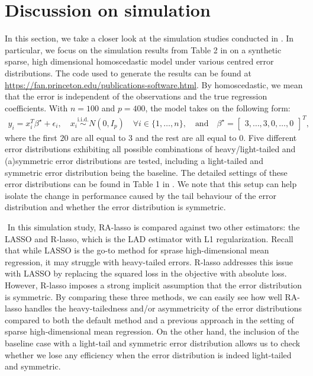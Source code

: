 

\section{Discussion on simulation}\label{sec:simulation}
In this section, we take a closer look at the simulation studies conducted in \citet{fan2017estimation}. In particular, we focus on the simulation results from Table 2 in \citet{fan2017estimation} on a synthetic sparse, high dimensional homoscedastic model under various centred error distributions. The code used to generate the results can be found at \url{https://fan.princeton.edu/publications-software.html}. By homoscedastic, we mean that the error is independent of the observations and the true regression coefficients. With $n=100$ and $p=400$, the model takes on the following form:
\begin{align*}
y_i = x_i^T \beta^\star + \epsilon_i, \quad x_i \overset{\text{i.i.d.}}{\sim} N(0, I_p) \quad \forall i \in \{1,\dots,n\}, \quad \text{and} \quad \beta^\star = \begin{bmatrix} 3, \dots, 3, 0, \dots, 0 \end{bmatrix}^T,
\end{align*}
where the first $20$ are all equal to $3$ and the rest are all equal to $0$. Five different error distributions exhibiting all possible combinations of heavy/light-tailed and (a)symmetric error distributions are tested, including a light-tailed and symmetric error distribution being the baseline. The detailed settings of these error distributions can be found in Table 1 in \citet{fan2017estimation}. We note that this setup can help isolate the change in performance caused by the tail behaviour of the error distribution and whether the error distribution is symmetric.

$ $\newline
In this simulation study, RA-lasso is compared against two other estimators: the LASSO and R-lasso, which is the LAD estimator with L1 regularization. Recall that while LASSO is the go-to method for sprase high-dimensional mean regression, it may struggle with heavy-tailed errors. R-lasso addresses this issue with LASSO by replacing the squared loss in the objective with absolute loss. However, R-lasso imposes a strong implicit assumption that the error distribution is symmetric. By comparing these three methods, we can easily see how well RA-lasso handles the heavy-tailedness and/or asymmetricity of the error distributions compared to both the default method and a previous approach in the setting of sparse high-dimensional mean regression. On the other hand, the inclusion of the baseline case with a light-tail and symmetric error distribution allows us to check whether we lose any efficiency when the error distribution is indeed light-tailed and symmetric.

